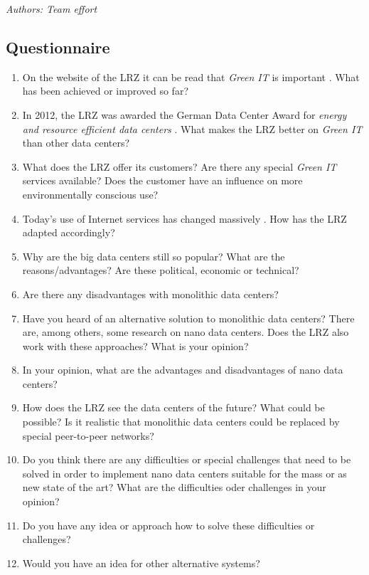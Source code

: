 \documentclass[sigchi-a, authorversion]{acmart}
\begin{document}
\textit{Authors: Team effort}\\

\nocite{*}



\begin{appendices}
\chapter{Questionnaire}
\begin{enumerate}
\label{appendix:quest}
\item On the website of the LRZ it can be read that \textit{Green IT} is important \cite{LRZGreenIT}. What has been achieved or improved so far?
\item In 2012, the LRZ was awarded the German Data Center Award for \textit{energy and resource efficient data centers} \cite{LRZGreenIT}. What makes the LRZ better on \textit{Green IT} than other data centers?
\item What does the LRZ offer its customers? Are there any special \textit{Green IT} services available? Does the customer have an influence on more environmentally conscious use?
\item Today's use of Internet services has changed massively \cite{TheZetta68:online}. How has the LRZ adapted accordingly?
\item Why are the big data centers still so popular? What are the reasons/advantages? Are these political, economic or technical?
\item Are there any disadvantages with monolithic data centers?
\item Have you heard of an alternative solution to monolithic data centers? There are, among others, some research on nano data centers. Does the LRZ also work with these approaches? What is your opinion?
\item In your opinion, what are the advantages and disadvantages of nano data centers?
\item How does the LRZ see the data centers of the future? What could be possible? Is it realistic that monolithic data centers could be replaced by special peer-to-peer networks?
\item Do you think there are any difficulties or special challenges that need to be solved in order to implement nano data centers suitable for the mass or as new state of the art? What are the difficulties oder challenges in your opinion?
\item Do you have any idea or approach how to solve these difficulties or challenges?
\item Would you have an idea for other alternative systems?
\end{enumerate}
\end{appendices}
\end{document}
